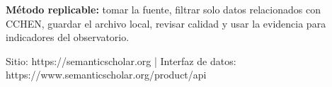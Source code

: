 \documentclass[9pt,a4paper]{extarticle}
\begin{document}
\vspace{0.06cm}
\begin{tcolorbox}[enhanced,colback=white,colframe=cchenpurple!55,boxrule=0.45pt,arc=2pt,left=6pt,right=6pt,top=5pt,bottom=5pt]
{\bfseries\color{cchenpurple}Método replicable:} tomar la fuente, filtrar solo datos relacionados con CCHEN, guardar el archivo local, revisar calidad y usar la evidencia para indicadores del observatorio.
\end{tcolorbox}

\vspace{0.02cm}
{\scriptsize\color{mutedgray}Sitio: https://semanticscholar.org \quad | \quad Interfaz de datos: https://www.semanticscholar.org/product/api}
\end{document}
